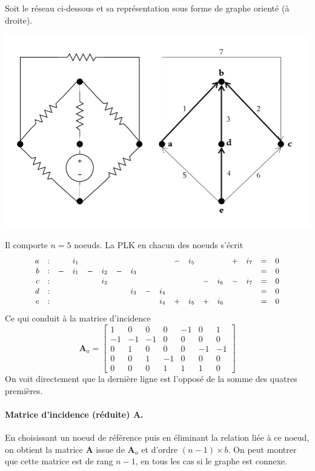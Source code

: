 \begin{testexample}
Soit le réseau ci-dessous et sa représentation sous forme de graphe orienté (à droite).
\begin{center}
\centering
\includegraphics[width=0.9\linewidth]{figs/graphes/circuit_et_graphe}
\end{center}
Il comporte $n=5$ noeuds. La PLK en chacun des noeuds s'écrit
$${\small 
\begin{array}{rccccccccccccccccl}
	a & : &  &i_1&  &   &  &   &  &   & - & i_5 & &   & + & i_7 & = & 0\\ 
	b & : & -&i_1& -&i_2&- &i_3&  &   &   &     & &   &   &     & = & 0\\
	c & : &  &   &  &i_2&  &   &  &   &   &     &-&i_6& - & i_7 & = & 0\\
	d & : &  &   &  &   &  &i_3&- &i_4&   &     & &   &   &     & = & 0\\
	e & : &  &   &  &   &  &   &  &i_4& + & i_5 &+&i_6&   &     & = & 0
\end{array}}
$$
Ce qui conduit à la matrice d'incidence
$$\mathbf{A}_a = \left[\begin{array}{rrrrrrr}
	1 & 0 & 0 & 0 & -1 & 0 & 1\\
	-1&-1 & -1& 0 & 0  & 0 & 0\\
	0 & 1 & 0 & 0 & 0  &-1 &-1\\
	0 & 0 & 1 &-1 & 0 & 0 & 0\\
	0 & 0 & 0 & 1 & 1 & 1 &0
\end{array}\right]$$
On voit directement que la dernière ligne est l'opposé de la somme des quatres premières.
\end{testexample}



\paragraph{Matrice d'incidence (réduite) $\mathbf{A}$.}
En choisissant un noeud de référence puis en éliminant la relation liée à ce noeud, on obtient la  matrice $\mathbf{A}$ issue de $\mathbf{A}_a$ et d'ordre $(n-1) \times b$. On peut montrer que cette matrice est de rang $n-1$, en tous les cas si le graphe est connexe.
  
